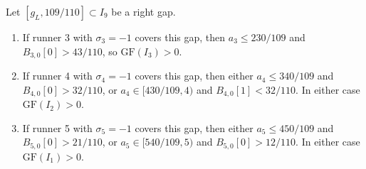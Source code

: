 \documentclass[12pt]{article}
\begin{document}
\begin{lemma}\label{l:52}
Let $[g_L,109/110]\subset I_9$ be a right gap.

\begin{enumerate}
\item If runner 3 with $\sigma_3=-1$ covers this gap, then $a_3\le 230/109$ and
   $B_{3,0}[0]>43/110$, so $\mathrm{GF}(I_3)>0$.
\item If runner 4 with $\sigma_4=-1$ covers this gap, then either $a_4\le 340/109$ and
   $B_{4,0}[0]>32/110$, or $a_4\in[430/109,4)$ and $B_{4,0}[1]<32/110$. In either
   case $\mathrm{GF}(I_2)>0$.
\item If runner 5 with $\sigma_5=-1$ covers this gap, then either $a_5\le 450/109$ and
   $B_{5,0}[0]>21/110$, or $a_5\in[540/109,5)$ and $B_{5,0}[0]>12/110$. In either
   case $\mathrm{GF}(I_1)>0$.
\end{enumerate}

\end{lemma}
\end{document}
